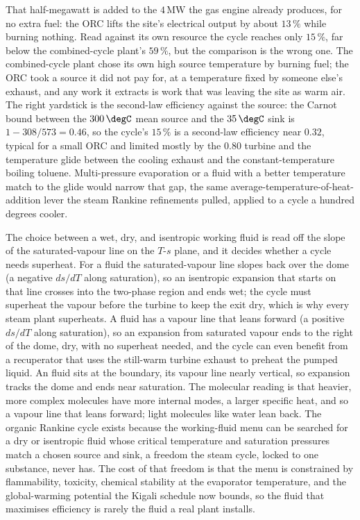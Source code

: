 That half-megawatt is added to the $4\,\text{MW}$ the gas engine already produces,
for no extra fuel: the ORC lifts the site's electrical output by about $13\,\%$
while burning nothing. Read against its own resource the cycle reaches only
$15\,\%$, far below the combined-cycle plant's $59\,\%$, but the comparison is
the wrong one. The combined-cycle plant chose its own high source temperature by
burning fuel; the ORC took a source it did not pay for, at a temperature fixed by
someone else's exhaust, and any work it extracts is work that was leaving the site
as warm air. The right yardstick is the second-law efficiency against the source:
the Carnot bound between the $300\,\degC$ mean source and the $35\,\degC$ sink is
$1 - 308/573 = 0.46$, so the cycle's $15\,\%$ is a second-law efficiency near
$0.32$, typical for a small ORC and limited mostly by the $0.80$ turbine and the
temperature glide between the cooling exhaust and the constant-temperature
boiling toluene. Multi-pressure evaporation or a fluid with a better temperature
match to the glide would narrow that gap, the same average-temperature-of-heat-addition
lever the steam Rankine refinements pulled, applied to a cycle a hundred degrees
cooler.

\begin{mastery}
The choice between a wet, dry, and isentropic working fluid is read off the slope
of the saturated-vapour line on the $T$-$s$ plane, and it decides whether a cycle
needs superheat. For a fluid the saturated-vapour line slopes back over the dome
(a negative $ds/dT$ along saturation), so an isentropic expansion that starts on
that line crosses into the two-phase region and ends wet; the cycle must superheat
the vapour before the turbine to keep the exit dry, which is why every steam plant
superheats. A  fluid has a vapour line that leans forward (a positive
$ds/dT$ along saturation), so an expansion from saturated vapour ends to the right
of the dome, dry, with no superheat needed, and the cycle can even benefit from a
recuperator that uses the still-warm turbine exhaust to preheat the pumped liquid.
An  fluid sits at the boundary, its vapour line nearly
vertical, so expansion tracks the dome and ends near saturation. The molecular
reading is that heavier, more complex molecules have more internal modes, a larger
specific heat, and so a vapour line that leans forward; light molecules like water
lean back. The organic Rankine cycle exists because the working-fluid menu can be
searched for a dry or isentropic fluid whose critical temperature and saturation
pressures match a chosen source and sink, a freedom the steam cycle, locked to one
substance, never has. The cost of that freedom is that the menu is constrained by
flammability, toxicity, chemical stability at the evaporator temperature, and the
global-warming potential the Kigali schedule now bounds, so the fluid that
maximises efficiency is rarely the fluid a real plant installs.
\end{mastery}

